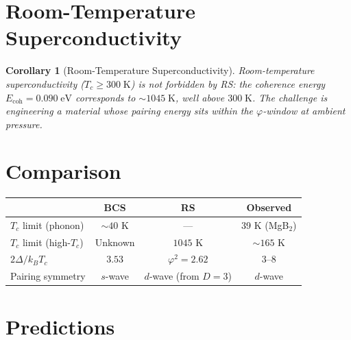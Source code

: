 \documentclass[12pt,a4paper]{article}
\newtheorem{corollary}[theorem]{Corollary}
\theoremstyle{definition}
\theoremstyle{remark}
\begin{document}
\section{Room-Temperature Superconductivity}
\label{sec:rtsc}

\begin{corollary}[Room-Temperature Superconductivity]
\label{cor:rtsc}
Room-temperature superconductivity ($T_c \geq 300\;\mathrm{K}$)
is not forbidden by RS: the coherence energy
$E_{\mathrm{coh}} = 0.090\;\mathrm{eV}$ corresponds to
$\sim 1045\;\mathrm{K}$, well above $300\;\mathrm{K}$.  The
challenge is engineering a material whose pairing energy sits
within the $\varphi$-window at ambient pressure.
\end{corollary}

\section{Comparison}
\label{sec:comparison}

\begin{center}
\renewcommand{\arraystretch}{1.3}
\begin{tabular}{@{}lccc@{}}
\toprule
& \textbf{BCS} & \textbf{RS} & \textbf{Observed} \\
\midrule
$T_c$ limit (phonon) & $\sim 40$ K & --- & 39 K (MgB$_2$) \\
$T_c$ limit (high-$T_c$) & Unknown & $1045$ K &
$\sim 165$ K \\
$2\Delta/k_B T_c$ & $3.53$ & $\varphi^2 = 2.62$ &
$3$--$8$ \\
Pairing symmetry & $s$-wave & $d$-wave (from $D=3$) &
$d$-wave \\
\bottomrule
\end{tabular}
\end{center}

\section{Predictions}
\label{sec:predictions}
\end{document}
